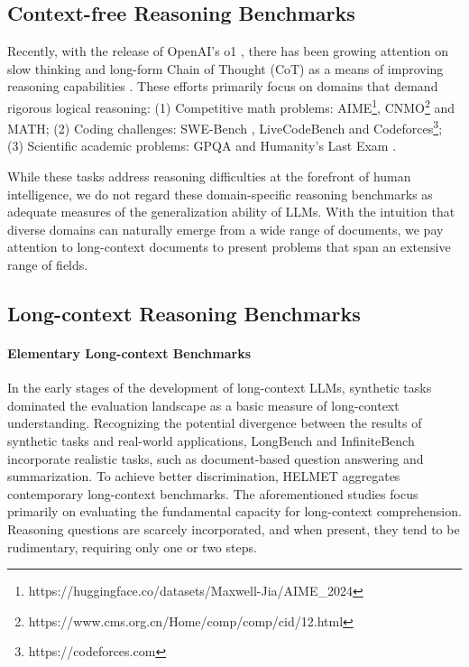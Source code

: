 \subsection{Context-free Reasoning Benchmarks}
Recently, with the release of OpenAI’s o1 \cite{o1report}, there has been growing attention on slow thinking and long-form Chain of Thought (CoT) as a means of improving reasoning capabilities \cite{deepseekai2025deepseekr1incentivizingreasoningcapability,qwq-32b-preview,Qin2024O1RJ}. These efforts primarily focus on domains that demand rigorous logical reasoning:
(1) Competitive math problems: AIME\footnote{https://huggingface.co/datasets/Maxwell-Jia/AIME\_2024\label{footnote:AIME}}, CNMO\footnote{https://www.cms.org.cn/Home/comp/comp/cid/12.html} and MATH\cite{MATH}; (2) Coding challenges: SWE-Bench \cite{SWE-bench}, LiveCodeBench \cite{LiveCodeBench} and Codeforces\footnote{https://codeforces.com}; (3) Scientific academic problems: GPQA \cite{GPQA} and Humanity's Last Exam  \cite{HLE}.

While these tasks address reasoning difficulties at the forefront of human intelligence, 
we do not regard these domain-specific reasoning benchmarks as adequate measures of the generalization ability of LLMs. With the intuition that diverse domains can naturally emerge from a wide range of documents, we pay attention to long-context documents to present problems that span an extensive range of fields.

\subsection{Long-context Reasoning Benchmarks}
\paragraph{Elementary Long-context Benchmarks} In the early stages of the development of long-context LLMs, synthetic tasks \cite{NIAH, RULER} dominated the evaluation landscape as a basic measure of long-context understanding. Recognizing the potential divergence between the results of synthetic tasks and real-world applications, LongBench \cite{LongBench} and InfiniteBench \cite{INFINITEBENCH} incorporate realistic tasks, such as document-based question answering and summarization. To achieve better discrimination, HELMET \cite{HELMET} aggregates contemporary long-context benchmarks. The aforementioned studies focus primarily on evaluating the fundamental capacity for long-context comprehension. Reasoning questions are scarcely incorporated, and when present, they tend to be rudimentary, requiring only one or two steps.

